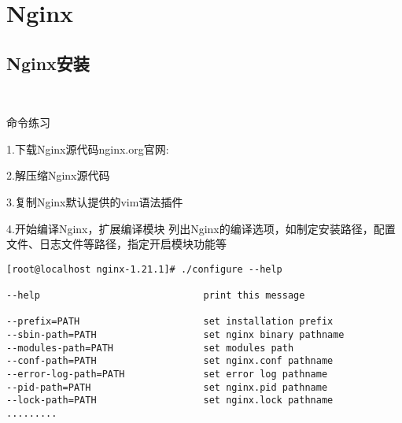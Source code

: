 \chapter{Nginx}

\section{Nginx安装}
~

\begin{ascolorbox10}{命令练习}
	\begin{ascboxJ}{1.下载Nginx源代码nginx.org官网:}
	\end{ascboxJ}

	\begin{ascboxJ}{2.解压缩Nginx源代码}
\end{ascboxJ}

	\begin{ascboxJ}{3.复制Nginx默认提供的vim语法插件}
\end{ascboxJ}	

	\begin{ascboxJ}{4.开始编译Nginx，扩展编译模块}
列出Nginx的编译选项，如制定安装路径，配置文件、日志文件等路径，指定开启模块功能等
	\begin{lstlisting}[style=linux]
[root@localhost nginx-1.21.1]# ./configure --help

--help                             print this message

--prefix=PATH                      set installation prefix
--sbin-path=PATH                   set nginx binary pathname
--modules-path=PATH                set modules path
--conf-path=PATH                   set nginx.conf pathname
--error-log-path=PATH              set error log pathname
--pid-path=PATH                    set nginx.pid pathname
--lock-path=PATH                   set nginx.lock pathname
.........


\end{lstlisting}
\end{ascboxJ}
\end{ascolorbox10}
